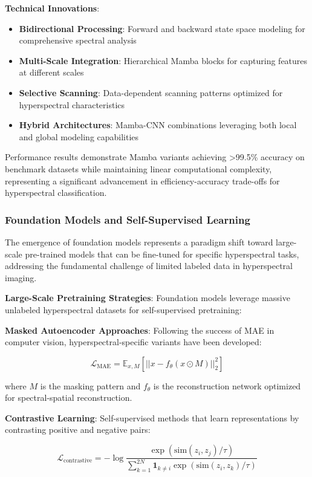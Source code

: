 \documentclass[journal]{IEEEtran}
\begin{document}
\textbf{Technical Innovations}:
\begin{itemize}
\item \textbf{Bidirectional Processing}: Forward and backward state space modeling for comprehensive spectral analysis
\item \textbf{Multi-Scale Integration}: Hierarchical Mamba blocks for capturing features at different scales
\item \textbf{Selective Scanning}: Data-dependent scanning patterns optimized for hyperspectral characteristics
\item \textbf{Hybrid Architectures}: Mamba-CNN combinations leveraging both local and global modeling capabilities
\end{itemize}

Performance results demonstrate Mamba variants achieving >99.5\% accuracy on benchmark datasets while maintaining linear computational complexity, representing a significant advancement in efficiency-accuracy trade-offs for hyperspectral classification.

\subsubsection{Foundation Models and Self-Supervised Learning}

The emergence of foundation models represents a paradigm shift toward large-scale pre-trained models that can be fine-tuned for specific hyperspectral tasks, addressing the fundamental challenge of limited labeled data in hyperspectral imaging.

\textbf{Large-Scale Pretraining Strategies}: Foundation models leverage massive unlabeled hyperspectral datasets for self-supervised pretraining:

\textbf{Masked Autoencoder Approaches}: Following the success of MAE in computer vision, hyperspectral-specific variants have been developed:

\begin{equation}
\mathcal{L}_{\text{MAE}} = \mathbb{E}_{x,M}[||x - f_{\theta}(x \odot M)||_2^2]
\end{equation}

where $M$ is the masking pattern and $f_{\theta}$ is the reconstruction network optimized for spectral-spatial reconstruction.

\textbf{Contrastive Learning}: Self-supervised methods that learn representations by contrasting positive and negative pairs:

\begin{equation}
\mathcal{L}_{\text{contrastive}} = -\log\frac{\exp(\text{sim}(z_i, z_j)/\tau)}{\sum_{k=1}^{2N}\mathbf{1}_{k \neq i}\exp(\text{sim}(z_i, z_k)/\tau)}
\end{equation}
\end{document}

